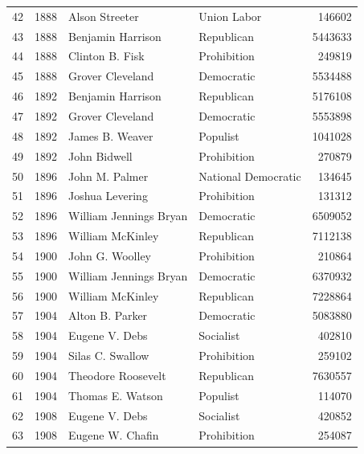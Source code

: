 \documentclass[
  letterpaper,
  DIV=11,
  numbers=noendperiod]{scrreprt}
\begin{document}
\begin{tabular}{lrllr}
42  &  1888 &          Alson Streeter &            Union Labor &        146602 \\
43  &  1888 &       Benjamin Harrison &             Republican &       5443633 \\
44  &  1888 &         Clinton B. Fisk &            Prohibition &        249819 \\
45  &  1888 &        Grover Cleveland &             Democratic &       5534488 \\
46  &  1892 &       Benjamin Harrison &             Republican &       5176108 \\
47  &  1892 &        Grover Cleveland &             Democratic &       5553898 \\
48  &  1892 &         James B. Weaver &               Populist &       1041028 \\
49  &  1892 &            John Bidwell &            Prohibition &        270879 \\
50  &  1896 &          John M. Palmer &    National Democratic &        134645 \\
51  &  1896 &         Joshua Levering &            Prohibition &        131312 \\
52  &  1896 &  William Jennings Bryan &             Democratic &       6509052 \\
53  &  1896 &        William McKinley &             Republican &       7112138 \\
54  &  1900 &         John G. Woolley &            Prohibition &        210864 \\
55  &  1900 &  William Jennings Bryan &             Democratic &       6370932 \\
56  &  1900 &        William McKinley &             Republican &       7228864 \\
57  &  1904 &         Alton B. Parker &             Democratic &       5083880 \\
58  &  1904 &          Eugene V. Debs &              Socialist &        402810 \\
59  &  1904 &        Silas C. Swallow &            Prohibition &        259102 \\
60  &  1904 &      Theodore Roosevelt &             Republican &       7630557 \\
61  &  1904 &        Thomas E. Watson &               Populist &        114070 \\
62  &  1908 &          Eugene V. Debs &              Socialist &        420852 \\
63  &  1908 &        Eugene W. Chafin &            Prohibition &        254087 \\

\end{tabular}
\end{document}
